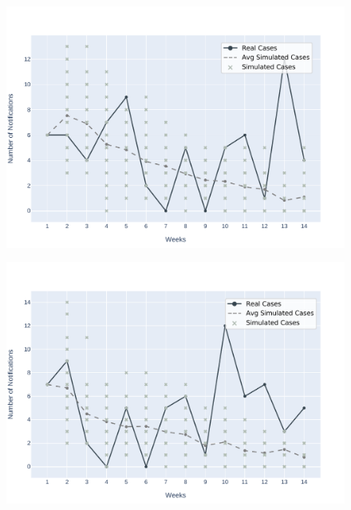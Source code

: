 \begin{figure}[!ht]
    \begin{minipage}[c]{.45\textwidth}
      \centering
      \includegraphics[scale=0.4]{images/experiments-lim/LIM-2019-04-14.pdf} \\
    \end{minipage}
    \hspace{0.5cm}
    \begin{minipage}[c]{.45\textwidth}
        \centering
        \includegraphics[scale=0.4]{images/experiments-lim/LIM-2019-05-05.pdf} \\
    \end{minipage}
    \\

\end{figure}
